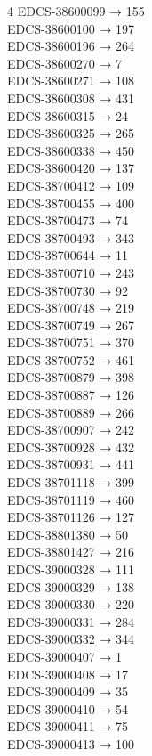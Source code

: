 \begin{multicols}{4}
EDCS-38600099 → 155\\
EDCS-38600100 → 197\\
EDCS-38600196 → 264\\
EDCS-38600270 → 7\\
EDCS-38600271 → 108\\
EDCS-38600308 → 431\\
EDCS-38600315 → 24\\
EDCS-38600325 → 265\\
EDCS-38600338 → 450\\
EDCS-38600420 → 137\\
EDCS-38700412 → 109\\
EDCS-38700455 → 400\\
EDCS-38700473 → 74\\
EDCS-38700493 → 343\\
EDCS-38700644 → 11\\
EDCS-38700710 → 243\\
EDCS-38700730 → 92\\
EDCS-38700748 → 219\\
EDCS-38700749 → 267\\
EDCS-38700751 → 370\\
EDCS-38700752 → 461\\
EDCS-38700879 → 398\\
EDCS-38700887 → 126\\
EDCS-38700889 → 266\\
EDCS-38700907 → 242\\
EDCS-38700928 → 432\\
EDCS-38700931 → 441\\
EDCS-38701118 → 399\\
EDCS-38701119 → 460\\
EDCS-38701126 → 127\\
EDCS-38801380 → 50\\
EDCS-38801427 → 216\\
EDCS-39000328 → 111\\
EDCS-39000329 → 138\\
EDCS-39000330 → 220\\
EDCS-39000331 → 284\\
EDCS-39000332 → 344\\
EDCS-39000407 → 1\\
EDCS-39000408 → 17\\
EDCS-39000409 → 35\\
EDCS-39000410 → 54\\
EDCS-39000411 → 75\\
EDCS-39000413 → 100\\

\end{multicols}

